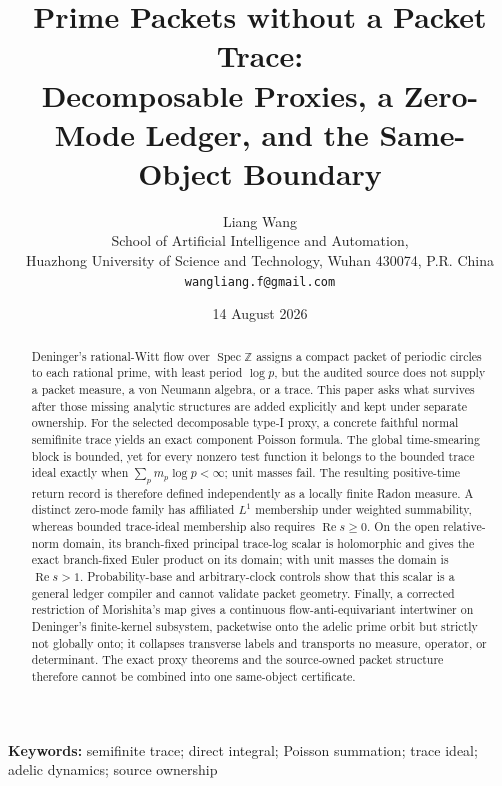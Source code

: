 \documentclass[11pt,a4paper]{article}
\title{\textbf{Prime Packets without a Packet Trace:}\\
Decomposable Proxies, a Zero-Mode Ledger, and the Same-Object Boundary}
\author{Liang Wang\\
\small School of Artificial Intelligence and Automation,\\[-2pt]
\small Huazhong University of Science and Technology, Wuhan 430074, P.R. China\\
\small \texttt{wangliang.f@gmail.com}}
\date{14 August 2026}
\theoremstyle{definition}
\newcommand{\Z}{\mathbb Z}
\newcommand{\Spec}{\operatorname{Spec}}
\begin{document}
\maketitle

\begin{abstract}
Deninger's rational-Witt flow over $\Spec\Z$ assigns a compact packet of
periodic circles to each rational prime, with least period $\log p$, but the
audited source does not supply a packet measure, a von Neumann algebra, or a
trace.  This paper asks what survives after those missing analytic structures
are added explicitly and kept under separate ownership.  For the selected
decomposable type-I proxy, a concrete faithful normal semifinite trace yields
an exact component Poisson formula.  The global time-smearing block is
bounded, yet for every nonzero test function it belongs to the bounded trace
ideal exactly when $\sum_p m_p\log p<\infty$; unit masses fail.  The resulting
positive-time return record is therefore defined independently as a locally
finite Radon measure.  A distinct zero-mode family has affiliated
$L^1$ membership under weighted summability, whereas bounded trace-ideal
membership also requires $\operatorname{Re}s\geq0$.  On the open relative-norm
domain, its branch-fixed principal trace-log scalar is holomorphic and gives
the exact branch-fixed Euler product on its domain; with unit masses the domain is
$\operatorname{Re}s>1$.  Probability-base and arbitrary-clock controls show
that this scalar is a general ledger compiler and cannot validate packet
geometry.  Finally, a corrected restriction of Morishita's map gives a
continuous flow-anti-equivariant intertwiner on Deninger's finite-kernel
subsystem, packetwise onto the adelic prime orbit but strictly not globally
onto; it collapses transverse labels and transports no measure, operator, or
determinant.  The exact proxy theorems and the source-owned packet structure
therefore cannot be combined into one same-object certificate.
\end{abstract}

\noindent\textbf{Keywords:} semifinite trace; direct integral; Poisson
summation; trace ideal; adelic dynamics; source ownership
\end{document}
